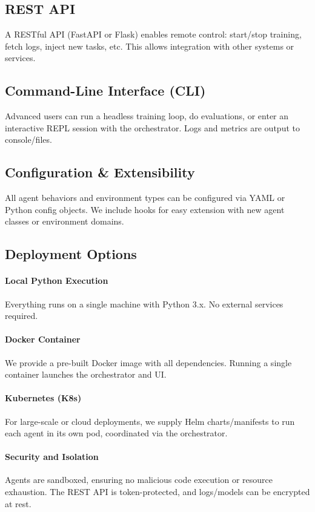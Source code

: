\documentclass{article}
\begin{document}
\subsection{REST API}
A RESTful API (FastAPI or Flask) enables remote control: start/stop training, fetch logs, inject new tasks, etc. This allows integration with other systems or services.

\subsection{Command-Line Interface (CLI)}
Advanced users can run a headless training loop, do evaluations, or enter an interactive REPL session with the orchestrator. Logs and metrics are output to console/files.

\subsection{Configuration \& Extensibility}
All agent behaviors and environment types can be configured via YAML or Python config objects. We include hooks for easy extension with new agent classes or environment domains.

\subsection{Deployment Options}
\paragraph{Local Python Execution}  
Everything runs on a single machine with Python 3.x. No external services required.

\paragraph{Docker Container}  
We provide a pre-built Docker image with all dependencies. Running a single container launches the orchestrator and UI.

\paragraph{Kubernetes (K8s)}  
For large-scale or cloud deployments, we supply Helm charts/manifests to run each agent in its own pod, coordinated via the orchestrator.

\paragraph{Security and Isolation}  
Agents are sandboxed, ensuring no malicious code execution or resource exhaustion. The REST API is token-protected, and logs/models can be encrypted at rest.
\end{document}
